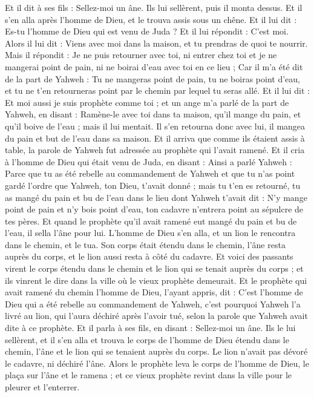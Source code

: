 \begin{multicols}{2}
Et il dit à ses fils : Sellez-moi un âne. Ils lui sellèrent, puis il monta dessus.
Et il s'en alla après l'homme de Dieu, et le trouva assis sous un chêne. Et il lui dit : Es-tu l'homme de Dieu qui est venu de Juda ? Et il lui répondit : C'est moi.
Alors il lui dit : Viens avec moi dans la maison, et tu prendras de quoi te nourrir.
Mais il répondit : Je ne puis retourner avec toi, ni entrer chez toi et je ne mangerai point de pain, ni ne boirai d'eau avec toi en ce lieu ;
Car il m'a été dit de la part de Yahweh : Tu ne mangeras point de pain, tu ne boiras point d'eau, et tu ne t'en retourneras point par le chemin par lequel tu seras allé.
Et il lui dit : Et moi aussi je suis prophète comme toi ; et un ange m'a parlé de la part de Yahweh, en disant : Ramène-le avec toi dans ta maison, qu'il mange du pain, et qu'il boive de l'eau ; mais il lui mentait.
Il s'en retourna donc avec lui, il mangea du pain et but de l'eau dans sa maison.
Et il arriva que comme ils étaient assis à table, la parole de Yahweh fut adressée au prophète qui l'avait ramené.
Et il cria à l'homme de Dieu qui était venu de Juda, en disant : Ainsi a parlé Yahweh : Parce que tu as été rebelle au commandement de Yahweh et que tu n'as point gardé l'ordre que Yahweh, ton Dieu, t'avait donné ;
mais tu t'en es retourné, tu as mangé du pain et bu de l'eau dans le lieu dont Yahweh t'avait dit : N'y mange point de pain et n'y bois point d'eau, ton cadavre n'entrera point au sépulcre de tes pères.
Et quand le prophète qu'il avait ramené eut mangé du pain et bu de l'eau, il sella l'âne pour lui.
L'homme de Dieu s'en alla, et un lion le rencontra dans le chemin, et le tua. Son corps était étendu dans le chemin, l'âne resta auprès du corps, et le lion aussi resta à côté du cadavre.
Et voici des passants virent le corps étendu dans le chemin et le lion qui se tenait auprès du corps ; et ils vinrent le dire dans la ville où le vieux prophète demeurait.
Et le prophète qui avait ramené du chemin l'homme de Dieu, l'ayant appris, dit : C'est l'homme de Dieu qui a été rebelle au commandement de Yahweh, c'est pourquoi Yahweh l'a livré au lion, qui l'aura déchiré après l'avoir tué, selon la parole que Yahweh avait dite à ce prophète.
Et il parla à ses fils, en disant : Sellez-moi un âne. Ils le lui sellèrent,
et il s'en alla et trouva le corps de l'homme de Dieu étendu dans le chemin, l'âne et le lion qui se tenaient auprès du corps. Le lion n'avait pas dévoré le cadavre, ni déchiré l'âne.
Alors le prophète leva le corps de l'homme de Dieu, le plaça sur l'âne et le ramena ; et ce vieux prophète revint dans la ville pour le pleurer et l'enterrer.

\end{multicols}
